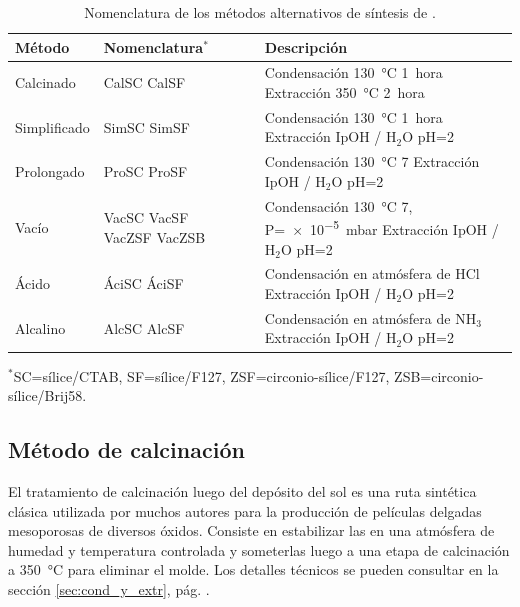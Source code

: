 	  	 \begin{table}[h!] 
		 	 \caption[Tratamientos alternativos de síntesis de \pdm]{Nomenclatura de los métodos alternativos de síntesis de \pdm.}
			 \begin{tabular}{>{\raggedright\arraybackslash}m{1.9cm}>{\centering\arraybackslash}m{1cm}>{\raggedright\arraybackslash}m{0.9cm}>{\raggedright\arraybackslash}m{6.62cm}} 
			 \toprule
				 Método   &  Nomenclatura$^*$&  & Descripción \\ \midrule
				 Calcinado & CalSC CalSF& &  Condensación \SI{130}{\celsius} \SI{1}{hora}\hspace{2cm} Extracción \SI{350}{\celsius} \SI{2}{hora}\hspace{2cm} \\ \midrule
				 Simplificado & SimSC SimSF& &  Condensación \SI{130}{\celsius} \SI{1}{hora}\hspace{2cm} Extracción IpOH / H$_2$O pH=2 \\ \midrule
				 Prolongado & ProSC ProSF& & Condensación \SI{130}{\celsius} \SI{7}{\text{días}}\hspace{2cm} Extracción IpOH / H$_2$O pH=2 \\ \midrule				
				 Vacío & VacSC VacSF VacZSF VacZSB& &  Condensación \SI{130}{\celsius} \SI{7}{\text{días}}, P=\SI{e-5}{\milli\bar}\hspace{2cm} Extracción IpOH / H$_2$O pH=2 \\ \midrule
				 Ácido & ÁciSC ÁciSF& &  Condensación en atmósfera de HCl\hspace{2cm} Extracción IpOH / H$_2$O pH=2 \\ \midrule
				 Alcalino & AlcSC AlcSF& & Condensación en atmósfera de NH$_3$\hspace{2cm} Extracción IpOH / H$_2$O pH=2 \\ 
				\bottomrule
				   \end{tabular}\vspace*{2pt}
		    	  	\footnotesize{$^*$SC=sílice/CTAB, SF=sílice/F127, ZSF=circonio-sílice/F127, ZSB=circonio-sílice/Brij58.}
				   	\label{tabla:tratamientos}
				   \end{table}
	
	  \pagebreak\subsection{Método de calcinación}\label{sub:m_todo_de_calcinaci_n}
	 	
	 		El tratamiento de calcinación luego del depósito del sol es una ruta sintética clásica utilizada por muchos autores para la producción de películas delgadas mesoporosas de diversos óxidos\cite{Soler-Illia2002a,Brinker1999,Soler-Illia2006,Grosso2004,Innocenzi2013,angelome2011}. Consiste en estabilizar las \pdm\space en una atmósfera de humedad y temperatura controlada y someterlas luego a una etapa de calcinación a \SI{350}{\celsius} para eliminar el molde. Los detalles técnicos se pueden consultar en la sección \ref{sec:cond_y_extr}, pág. \pageref{sec:cond_y_extr}.

